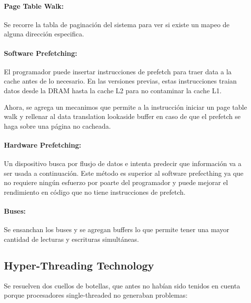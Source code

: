 \paragraph{Page Table Walk:} Se recorre la tabla de paginación del sistema para ver si existe un mapeo de alguna dirección especifica.

\paragraph{Software Prefetching:} El programador puede insertar instrucciones de prefetch para traer data a la cache antes de lo necesario. En las versiones previas, estas instrucciones traian datos desde la DRAM hasta la cache L2 para no contaminar la cache L1.

Ahora, se agrega un mecanimos que permite a la instrucción iniciar un page table walk y rellenar al data translation lookaside buffer en caso de que el prefetch se haga sobre una página no cacheada.

\paragraph{Hardware Prefetching:} Un dispositivo busca por flusjo de datos e intenta predecir que información va a ser usada a continuación. Este método es superior al software prefecthing ya que no requiere ningún esfuerzo por poarte del programador y puede mejorar el rendimiento en código que no tiene instrucciones de prefetch.

\paragraph{Buses:} Se ensanchan los buses y se agregan buffers lo que permite tener una mayor cantidad de lecturas y escrituras simultáneas.

\subsection{Hyper-Threading Technology}
Se resuelven dos cuellos de botellas, que antes no habían sido tenidos en cuenta porque procesadores single-threaded no generaban problemas:

